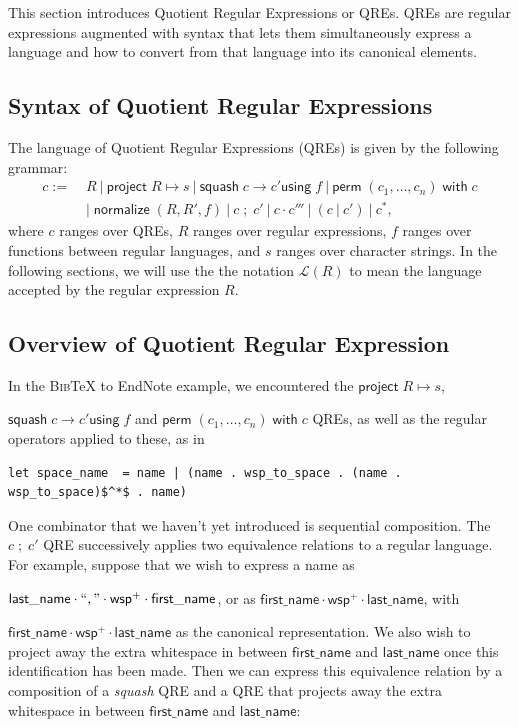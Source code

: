 \documentclass[acmsmall,review,anonymous]{acmart}\settopmatter{printfolios=true,printccs=false,printacmref=false}
\newcommand{\kw}[1]{\ensuremath{\mathsf{#1}}}
\newcommand{\project}[2]{\ensuremath{\kw{project} \; #1 \mapsto #2}}
\newcommand{\squash}[3]{\ensuremath{\kw{squash} \; #1 \rightarrow #2
\kw{using} \; #3}}
\newcommand{\perm}[2]{\ensuremath{\kw{perm}\; (#1)\; \kw{with}\; #2}}
\newcommand{\normalize}[3]{\ensuremath{\kw{normalize} \; (#1, #2, #3)}}
\newcommand{\sep}{\ensuremath{\ | \ }}
\newcommand{\bibtex}{\textsc{Bib}\TeX{}}
\newcommand{\semicolon}{\ensuremath{\; ; \;}}
\begin{document}
This section introduces Quotient Regular Expressions or QREs. QREs are regular
expressions augmented with syntax that lets them simultaneously express a
language and how to convert from that language into its canonical elements.

\subsection{Syntax of Quotient Regular Expressions}
The language of Quotient Regular Expressions (QREs) is given by the following
grammar:
\begin{align*}
c := \; &R \sep \project{R}{s} \sep \squash{c}{c'}{f} \sep
\perm{c_1, \ldots, c_n}{c} \\
& | \; \normalize{R}{R'}{f} \sep c \semicolon c' \sep c \cdot c''' \sep (c \sep
c') \sep c^*,
\end{align*}
where $c$ ranges over QREs, $R$ ranges over regular expressions, $f$ ranges over
functions between regular languages, and $s$ ranges over character strings. In
the following sections, we will use the the notation $\mathcal{L}(R)$ to mean
the language accepted by the regular expression $R$.

\subsection{Overview of Quotient Regular Expression}
In the \bibtex{} to EndNote example, we encountered the $\project{R}{s}$,

\noindent $\squash{c}{c'}{f}$ and $\perm{c_1, \ldots, c_n}{c}$ QREs, as well as
the regular operators applied to these, as in

\begin{lstlisting}
let space_name  = name | (name . wsp_to_space . (name . wsp_to_space)$^*$ . name)
\end{lstlisting}

One combinator that we haven't yet introduced is sequential composition.
The $c \semicolon c'$ QRE successively applies
two equivalence relations to a regular language. For example, suppose that
we wish to express a name as

\noindent $\kw{last\_name \cdot ``,\text{''} \cdot wsp^+ \cdot first\_name}$,
or as $\kw{first\_name\cdot wsp^+ \cdot last\_name}$, with

\noindent $\kw{first\_name\cdot wsp^+ \cdot last\_name}$ as the canonical
representation. We also wish to project away the extra whitespace in between
\kw{first\_name} and \kw{last\_name} once this identification has been made.
Then we can express this equivalence relation by a composition of a
\textit{squash} QRE and a QRE that projects away the extra whitespace in between
\kw{first\_name} and \kw{last\_name}:
\end{document}

